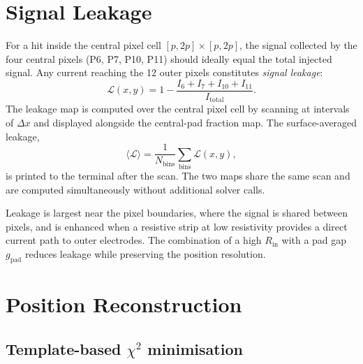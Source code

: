 \documentclass[preprint,numbers,1p]{elsarticle}
\begin{document}
\section{Signal Leakage}
\label{sec:leakage}

For a hit inside the central pixel cell $[p,2p]\times[p,2p]$, the signal collected by the
four central pixels (P6, P7, P10, P11) should ideally equal the total injected signal. Any
current reaching the 12 outer pixels constitutes \emph{signal leakage}:
\begin{equation}
  \mathcal{L}(x,y) = 1 - \frac{I_6 + I_7 + I_{10} + I_{11}}{I_\mathrm{total}}.
\end{equation}
The leakage map is computed over the central pixel cell by scanning at intervals of $\Delta x$
and displayed alongside the central-pad fraction map. The surface-averaged leakage,
\begin{equation}
  \langle\mathcal{L}\rangle = \frac{1}{N_\mathrm{bins}}\sum_{\mathrm{bins}} \mathcal{L}(x,y),
\end{equation}
is printed to the terminal after the scan. The two maps share the same scan and are computed
simultaneously without additional solver calls.

Leakage is largest near the pixel boundaries, where the signal is shared between pixels, and
is enhanced when a resistive strip at low resistivity provides a direct current path to outer
electrodes. The combination of a high $R_\mathrm{in}$ with a pad gap $g_\mathrm{pad}$ reduces
leakage while preserving the position resolution.

\section{Position Reconstruction}
\label{sec:reco}

\subsection{Template-based $\chi^2$ minimisation}
\label{sec:chi2}
\end{document}
